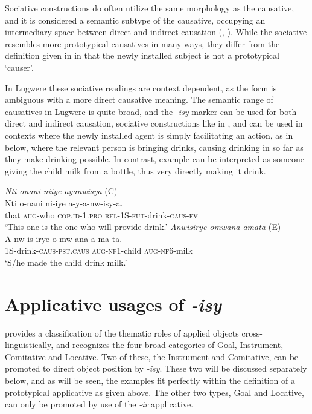 \documentclass[output=paper,colorlinks,citecolor=brown,draftmode]{langscibook}
\begin{document}
Sociative constructions do often utilize the same morphology as the causative, and it is considered a semantic subtype of the causative, occupying an intermediary space between direct and indirect causation (\cite{shibatani2002causative}, \cite{zuniga2019grammatical}). While the sociative resembles more prototypical causatives in many ways, they differ from the definition given in  in that the newly installed subject is not a prototypical `causer'. 

In Lugwere these sociative readings are context dependent, as the form is ambiguous with a more direct causative meaning. The semantic range of causatives in Lugwere is quite broad, and the \emph{-isy} marker can be used for both direct and indirect causation, sociative constructions like in , and can be used in contexts where the newly installed agent is simply facilitating an action, as in  below, where the relevant person is bringing drinks, causing drinking in so far as they make drinking possible. In contrast, example  can be interpreted as someone giving the child milk from a bottle, thus very directly making it drink. 

\ea \label{ex:Saebo:facilitate} \emph{Nti onani niiye ayanwisya} (C) \\
  \gll  Nti o-nani ni-iye a-y-a-nw-isy-a. \\ 
that \textsc{aug}-who \textsc{cop.id}-\textsc{1.pro} \textsc{rel}-1S-\textsc{fut}-drink-\textsc{caus-fv}\\
    \glt  `This one is the one who will provide drink.' 
      \z
\ea \label{ex:Saebo:direct2} \emph{Anwisirye omwana amata} (E) \\
  \gll A-nw-is-irye o-mw-ana a-ma-ta. \\ 
1S-drink-\textsc{caus-pst.caus} \textsc{aug-nf1}-child \textsc{aug-nf6}-milk \\
    \glt  `S/he made the child drink milk.' 
      \z

\section{Applicative usages of \emph{-isy}} \label{sec:Saebo:applicative}

\citet{dixon2010basic} provides a classification of the thematic roles of applied objects cross-linguistically, and recognizes the four broad categories of Goal, Instrument, Comitative and Locative. Two of these, the Instrument and Comitative, can be promoted to direct object position by \emph{-isy}. These two will be discussed separately below, and as will be seen, the examples fit perfectly within the definition of a prototypical applicative as given above. The other two types, Goal and Locative, can only be promoted by use of the \emph{-ir} applicative. 
\end{document}
